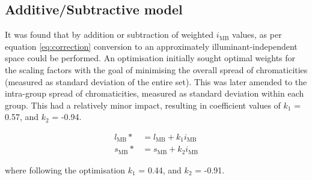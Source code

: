 



\subsection{Additive/Subtractive model}

It was found that by addition or subtraction of weighted $i_{\text{MB}}$ values, as per equation \ref{eq:correction} conversion to an approximately illuminant-independent space could be performed. An optimisation initially sought optimal weights for the scaling factors with the goal of minimising the overall spread of chromaticities (measured as standard deviation of the entire set). This was later amended to the intra-group spread of chromaticities, measured as standard deviation within each group. This had a relatively minor impact, resulting in coefficient values of $k_{1}$ = 0.57, and $k_{2}$ = -0.94. 

\begin{subequations} \label{eq:correction}
\begin{align}
l_{\text{MB}}* &= l_{\text{MB}} + k_{1}i_{\text{MB}}\\ %
s_{\text{MB}}* &= s_{\text{MB}} + k_{2}i_{\text{MB}}
\end{align}
\end{subequations}

where following the optimisation $k_{1}$ = 0.44, and $k_{2}$ = -0.91.

